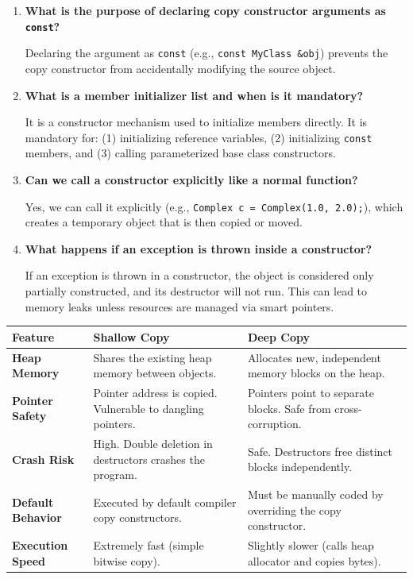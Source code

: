 \documentclass[12pt,a4paper]{article}
\newcommand{\Q}[1]{\textbf{#1}\par\noindent\ignorespaces}
\renewcommand{\arraystretch}{1.45}
\begin{document}
\begin{tcolorbox}[exambox, title={\textbf{Frequently Asked / Viva Questions}}]
\begin{enumerate}[topsep=0pt, label=\textbf{Q\arabic*.}, itemsep=5pt]
  \item \Q{What is the purpose of declaring copy constructor arguments as \texttt{const}?}
    Declaring the argument as \texttt{const} (e.g., \texttt{const MyClass \&obj}) prevents the copy constructor from accidentally modifying the source object.
  \item \Q{What is a member initializer list and when is it mandatory?}
    It is a constructor mechanism used to initialize members directly. It is mandatory for: (1) initializing reference variables, (2) initializing \texttt{const} members, and (3) calling parameterized base class constructors.
  \item \Q{Can we call a constructor explicitly like a normal function?}
    Yes, we can call it explicitly (e.g., \texttt{Complex c = Complex(1.0, 2.0);}), which creates a temporary object that is then copied or moved.
  \item \Q{What happens if an exception is thrown inside a constructor?}
    If an exception is thrown in a constructor, the object is considered only partially constructed, and its destructor will not run. This can lead to memory leaks unless resources are managed via smart pointers.
\end{enumerate}
\end{tcolorbox}

\begin{tcolorbox}[tikzbox, title={Comparison: Shallow Copy vs. Deep Copy}]
\renewcommand{\arraystretch}{1.45}
\par\noindent
\begin{tabularx}{\linewidth}{|B{3.2cm}|Y|Y|}
\hline
\textbf{Feature} & \textbf{\color{myred}Shallow Copy} & \textbf{\color{mygreen}Deep Copy} \\
\hline
\textbf{Heap Memory} & Shares the existing heap memory between objects. & Allocates new, independent memory blocks on the heap. \\
\hline
\textbf{Pointer Safety} & Pointer address is copied. Vulnerable to dangling pointers. & Pointers point to separate blocks. Safe from cross-corruption. \\
\hline
\textbf{Crash Risk} & High. Double deletion in destructors crashes the program. & Safe. Destructors free distinct blocks independently. \\
\hline
\textbf{Default Behavior} & Executed by default compiler copy constructors. & Must be manually coded by overriding the copy constructor. \\
\hline
\textbf{Execution Speed} & Extremely fast (simple bitwise copy). & Slightly slower (calls heap allocator and copies bytes). \\
\hline
\end{tabularx}
\end{tcolorbox}
\end{document}
